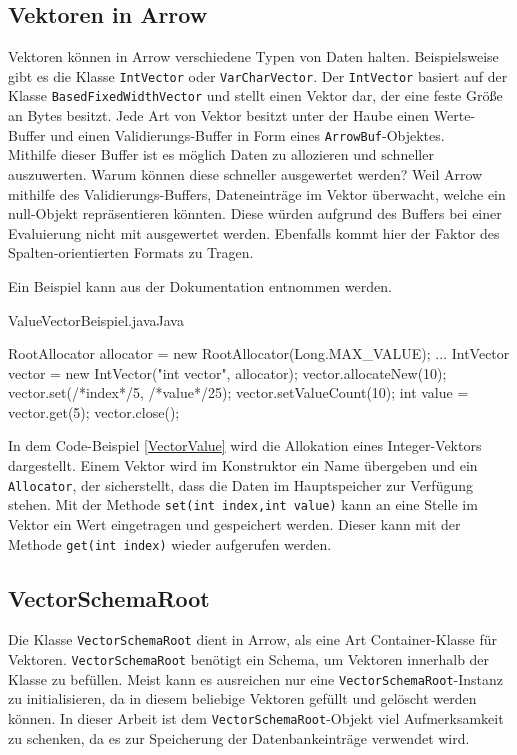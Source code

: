 \subsection{Vektoren in Arrow}
Vektoren können in Arrow verschiedene Typen von Daten halten. Beispielsweise gibt es die Klasse \texttt{IntVector} oder \texttt{VarCharVector}.
Der \texttt{IntVector} basiert auf der Klasse \texttt{BasedFixedWidthVector} und stellt einen Vektor dar, der eine feste Größe an Bytes besitzt. Jede Art von Vektor besitzt unter der Haube einen Werte-Buffer und einen Validierungs-Buffer in Form eines \texttt{ArrowBuf}-Objektes.\\
Mithilfe dieser Buffer ist es möglich Daten zu allozieren und schneller auszuwerten. Warum können diese schneller ausgewertet werden?
Weil Arrow mithilfe des Validierungs-Buffers, Dateneinträge im Vektor überwacht, welche ein null-Objekt repräsentieren könnten. Diese würden aufgrund des Buffers bei einer Evaluierung nicht mit ausgewertet werden. Ebenfalls kommt hier der Faktor des Spalten-orientierten Formats zu Tragen.

Ein Beispiel kann aus der Dokumentation \cite{Apache:Arrow:ValueVector} entnommen werden.

\label{VectorValue}
\begin{codeblock}{ValueVectorBeispiel.java}{Java}
  \begin{javacode}

RootAllocator allocator = new RootAllocator(Long.MAX_VALUE);
...
IntVector vector = new IntVector("int vector", allocator);
vector.allocateNew(10);
vector.set(/*index*/5, /*value*/25);
vector.setValueCount(10);
int value = vector.get(5); 
vector.close();
  \end{javacode}
\end{codeblock}

In dem Code-Beispiel \ref{VectorValue} wird die Allokation eines Integer-Vektors dargestellt. Einem Vektor wird im Konstruktor ein Name übergeben und ein \texttt{Allocator}, der sicherstellt, dass die Daten im Hauptspeicher zur Verfügung stehen.
Mit der Methode \texttt{set(int index,int value)} kann an eine Stelle im Vektor ein Wert eingetragen und gespeichert werden.
Dieser kann mit der Methode \texttt{get(int index)} wieder aufgerufen werden.


\subsection{VectorSchemaRoot}

Die Klasse \texttt{VectorSchemaRoot} dient in Arrow, als eine Art Container-Klasse für Vektoren. \texttt{VectorSchemaRoot} benötigt ein Schema, um Vektoren innerhalb der Klasse zu befüllen.
Meist kann es ausreichen nur eine \texttt{VectorSchemaRoot}-Instanz zu initialisieren, da in diesem beliebige Vektoren gefüllt und gelöscht werden können.
In dieser Arbeit ist dem \texttt{VectorSchemaRoot}-Objekt viel Aufmerksamkeit zu schenken, da es zur Speicherung der Datenbankeinträge verwendet wird.

